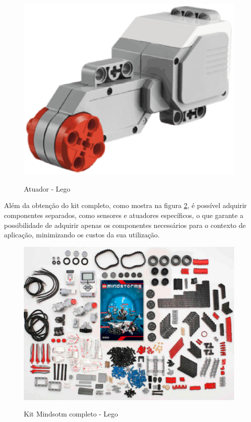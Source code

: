 \begin{figure}[H]
	\centering
	\caption{Atuador - Lego}
	\includegraphics[scale=0.5]{figuras/atuadorLego.eps}
	\label{img:atuadorLego}
\end{figure}

Além da obtenção do kit completo, como mostra na figura \ref{img:kit}, é possível adquirir componentes separados, como sensores e atuadores específicos, o que garante a possibilidade de adquirir apenas os componentes necessários para o contexto de aplicação, minimizando os custos da sua utilização.

\begin{figure}[H]
	\centering
	\caption{Kit Mindsotm completo - Lego}
	\includegraphics[scale=0.7]{figuras/kitLego.eps}
	\label{img:kit}
\end{figure}


